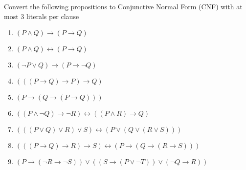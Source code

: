 \documentclass[10.5pt]{article}
\newenvironment{solution}[2][Solution]{ \begin{trivlist}
\item[\hskip \labelsep {\bfseries #1}]}{\end{trivlist}}
\newenvironment{problem}[2][Problem]{\begin{trivlist}
\item[\hskip \labelsep {\bfseries #1}\hskip \labelsep {\bfseries #2.}]}{\end{trivlist}}
\begin{document}
\begin{solution}{5}
\begin{enumerate}
\begin{enumerate}[label=(\alph*)]
\end{enumerate}
\end{enumerate}
\end{solution}


\vskip 1.5in
\newpage
\begin{problem}{6}Convert the following propositions to Conjunctive Normal Form (CNF) with at most 3 literals per clause
\begin{enumerate}
  \parskip=0in
  \parsep=0in
  \itemsep=0in
\item $(P \wedge Q) \rightarrow (P \rightarrow Q)$
\item $(P \wedge Q) \leftrightarrow (P \rightarrow Q)$
\item $(\lnot P \vee Q) \rightarrow (P \rightarrow \lnot Q)$
\item $(((P \rightarrow Q) \rightarrow P) \rightarrow Q)$
\item $(P \rightarrow (Q \rightarrow (P \rightarrow Q)))$
\item $((P \wedge \lnot Q) \rightarrow \lnot R) \leftrightarrow ((P \wedge R) \rightarrow Q)$
\item $(((P \vee Q) \vee R) \vee S) \leftrightarrow (P \vee (Q \vee (R \vee S)))$
\item $(((P \rightarrow Q) \rightarrow R) \rightarrow S) \leftrightarrow (P \rightarrow (Q \rightarrow (R \rightarrow S)))$
\item $(P \rightarrow (\lnot R \rightarrow \lnot S)) \vee ((S \rightarrow (P \vee \lnot T)) \vee (\lnot Q \rightarrow R))$
\end{enumerate}
\end{problem}
\end{document}
